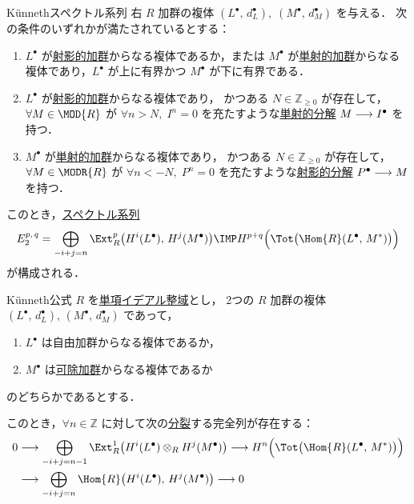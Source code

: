 \documentclass[algtopo_main]{subfiles}
\begin{document}
\begin{mytheo}[label=SS:Kunneth-Ext]{K\"unnethスペクトル系列}
    右 $R$ 加群の複体 $(L^\bullet,\, d_L^\bullet),\;(M^\bullet,\, d_M^\bullet)$ を与える．
    次の条件のいずれかが満たされているとする：
    \begin{enumerate}
        \item $L^\bullet$ が\hyperref[def:proj-mod]{射影的加群}からなる複体であるか，または $M^\bullet$ が\hyperref[def:inj-mod]{単射的加群}からなる複体であり，$L^\bullet$ が上に有界かつ $M^\bullet$ が下に有界である．
        \item $L^\bullet$ が\hyperref[def:proj-mod]{射影的加群}からなる複体であり，
        かつある $N \in \mathbb{Z}_{\ge 0}$ が存在して，$\forall M \in \MOD{R}$ が $\forall n > N,\; I^n = 0$ を充たすような\hyperref[def:injective-resolution]{単射的分解} $M \longrightarrow I^\bullet$ を持つ．
        \item $M^\bullet$ が\hyperref[def:inj-mod]{単射的加群}からなる複体であり，
        かつある $N \in \mathbb{Z}_{\ge 0}$ が存在して，$\forall M \in \MODR{R}$ が $\forall n < -N,\; P^n = 0$ を充たすような\hyperref[def:projective-resolution]{射影的分解} $P^\bullet \longrightarrow M$ を持つ．
    \end{enumerate}
    
    このとき，\hyperref[def:SSQ]{スペクトル系列}
    \begin{align}
        E_2^{p,\, q} = \bigoplus_{-i+j = n} \Ext_R^{p} \bigl( H^i(L^\bullet),\, H^j(M^\bullet) \bigr) \IMP H^{p+q} \Bigl( \Tot\bigl( \Hom{R}(L^\bullet,\, M^*)\bigr) \Bigr) 
    \end{align}
    が構成される．
\end{mytheo}


\begin{mycol}[label=col:Kunneth-Ext]{K\"unneth公式}
    $R$ を\hyperref[def:PID]{単項イデアル整域}とし，
    2つの $R$ 加群の複体 $(L^\bullet,\, d_L^\bullet),\, (M^\bullet,\, d_M^\bullet)$ であって，
    \begin{enumerate}
        \item $L^\bullet$ は自由加群からなる複体であるか，
        \item $M^\bullet$ は\hyperref[def:divisable-mod]{可除加群}からなる複体であるか
    \end{enumerate}
    のどちらかであるとする．
    
    このとき，$\forall n \in \mathbb{Z}$ に対して次の\hyperref[def:split]{分裂}する完全列が存在する：
        \begin{align}
            0 &\lto \bigoplus_{-i+j=n-1} \Ext_R^1\bigl( H^i(L^\bullet) \otimes_R H^j(M^\bullet)\bigr) \lto H^n \Bigl( \Tot\bigl( \Hom{R}(L^\bullet,\, M^*)\bigr) \Bigr)  \\
            &\lto \bigoplus_{-i+j=n} \Hom{R} \bigl(H^i(L^\bullet),\, H^j(M^\bullet) \bigr) \lto 0 \label{SES:Kunneth-Ext}
        \end{align}
\end{mycol}
\end{document}
